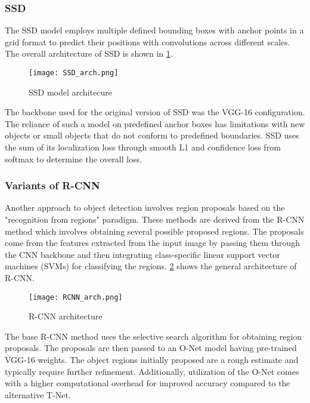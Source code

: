 \subsubsection{SSD}
\label{sec:SSD}

The SSD model employs multiple defined bounding boxes with anchor points in a grid format to predict their positions with convolutions across different scales. The overall architecture of SSD is shown in \cref{fig:ssdarch}. 

\begin{figure}[!htb]
\centering
\texttt{[image: SSD\_arch.png]}
\caption{SSD model architecure}
\label{fig:ssdarch}
\end{figure}

The backbone used for the original version of SSD was the VGG-16 configuration. The reliance of such a model on predefined anchor boxes has limitations with new objects or small objects that do not conform to predefined boundaries.
SSD uses the sum of its localization loss through smooth L1  and confidence loss from softmax to determine the overall loss.


\subsubsection{Variants of R-CNN}
\label{sec:R-CNN}

Another approach to object detection involves region proposals based on the "recognition from regions" paradigm. These methods are derived from the R-CNN method which involves obtaining several possible proposed regions. The proposals come from the features extracted from the input image by passing them through the CNN backbone and then integrating class-specific linear support vector machines (SVMs) for classifying the regions. \cref{fig:rcnn} shows the general architecture of R-CNN. 

\begin{figure}[!htb]
\centering
\texttt{[image: RCNN\_arch.png]}
\caption{R-CNN architecture}
\label{fig:rcnn}
\end{figure}

The base R-CNN method uses the selective search algorithm for obtaining region proposals. The proposals are then passed to an O-Net model having pre-trained VGG-16 weights. The object regions initially proposed are a rough estimate and typically require further refinement. Additionally, utilization of the O-Net comes with a higher computational overhead for improved accuracy compared to the alternative T-Net.


